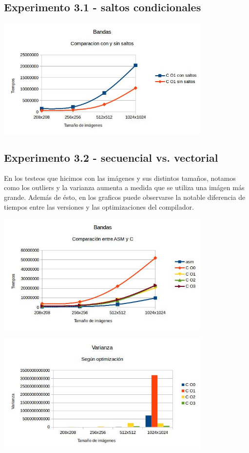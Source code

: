 \documentclass[a4paper]{article}
\begin{document}
\subsection{Experimento 3.1 - saltos condicionales}

\includegraphics[height=6cm]{imagenes/bandasCsaltos.jpg}



\vspace*{0.3cm} \noindent
\subsection{Experimento 3.2 - secuencial vs. vectorial}

En los testeos que hicimos con las im\'agenes y sus distintos tamaños, notamos como los outliers y la varianza aumenta a medida que se utiliza una im\'agen m\'as grande.
Adem\'as de \'esto, en los graficos puede observarse la notable diferencia de tiempos entre las versiones y las optimizaciones del compilador.

\includegraphics[height=6cm]{imagenes/bandasAsmC.jpg}


\includegraphics[height=6cm]{imagenes/bandasVarianza.jpg}
\end{document}
